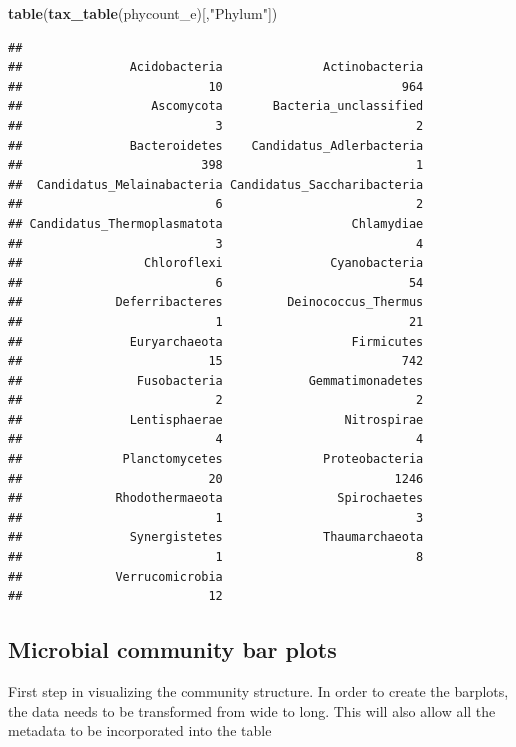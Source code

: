 \documentclass[
]{article}
\newenvironment{Shaded}{\begin{snugshade}}{\end{snugshade}}
\newcommand{\FunctionTok}[1]{\textcolor[rgb]{0.13,0.29,0.53}{\textbf{#1}}}
\newcommand{\NormalTok}[1]{#1}
\newcommand{\StringTok}[1]{\textcolor[rgb]{0.31,0.60,0.02}{#1}}
\begin{document}
\begin{Shaded}
\begin{Highlighting}[]
\FunctionTok{table}\NormalTok{(}\FunctionTok{tax\_table}\NormalTok{(phycount\_e)[,}\StringTok{"Phylum"}\NormalTok{])}
\end{Highlighting}
\end{Shaded}

\begin{verbatim}
## 
##               Acidobacteria              Actinobacteria 
##                          10                         964 
##                  Ascomycota       Bacteria_unclassified 
##                           3                           2 
##               Bacteroidetes    Candidatus_Adlerbacteria 
##                         398                           1 
##  Candidatus_Melainabacteria Candidatus_Saccharibacteria 
##                           6                           2 
## Candidatus_Thermoplasmatota                  Chlamydiae 
##                           3                           4 
##                 Chloroflexi               Cyanobacteria 
##                           6                          54 
##             Deferribacteres         Deinococcus_Thermus 
##                           1                          21 
##               Euryarchaeota                  Firmicutes 
##                          15                         742 
##                Fusobacteria            Gemmatimonadetes 
##                           2                           2 
##               Lentisphaerae                 Nitrospirae 
##                           4                           4 
##              Planctomycetes              Proteobacteria 
##                          20                        1246 
##             Rhodothermaeota                Spirochaetes 
##                           1                           3 
##               Synergistetes              Thaumarchaeota 
##                           1                           8 
##             Verrucomicrobia 
##                          12
\end{verbatim}

\subsection{Microbial community bar
plots}\label{microbial-community-bar-plots}

First step in visualizing the community structure. In order to create
the barplots, the data needs to be transformed from wide to long. This
will also allow all the metadata to be incorporated into the table
\end{document}

